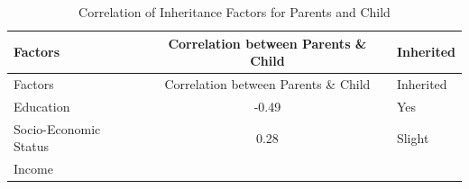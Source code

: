 \documentclass[12pt,twoside]{reedthesis}
\theoremstyle{definition}
\theoremstyle{definition}
\theoremstyle{remark}
\begin{document}
  \begin{longtable}[]{@{}lcl@{}}
  \caption{\label{tab:inher} Correlation of Inheritance Factors for Parents
  and Child}\tabularnewline
  \toprule
  \begin{minipage}[b]{0.29\columnwidth}\raggedright\strut
  Factors\strut
  \end{minipage} & \begin{minipage}[b]{0.47\columnwidth}\centering\strut
  Correlation between Parents \& Child\strut
  \end{minipage} & \begin{minipage}[b]{0.16\columnwidth}\raggedright\strut
  Inherited\strut
  \end{minipage}\tabularnewline
  \midrule
  \endfirsthead
  \toprule
  \begin{minipage}[b]{0.29\columnwidth}\raggedright\strut
  Factors\strut
  \end{minipage} & \begin{minipage}[b]{0.47\columnwidth}\centering\strut
  Correlation between Parents \& Child\strut
  \end{minipage} & \begin{minipage}[b]{0.16\columnwidth}\raggedright\strut
  Inherited\strut
  \end{minipage}\tabularnewline
  \midrule
  \endhead
  \begin{minipage}[t]{0.29\columnwidth}\raggedright\strut
  Education\strut
  \end{minipage} & \begin{minipage}[t]{0.47\columnwidth}\centering\strut
  -0.49\strut
  \end{minipage} & \begin{minipage}[t]{0.16\columnwidth}\raggedright\strut
  Yes\strut
  \end{minipage}\tabularnewline
  \begin{minipage}[t]{0.29\columnwidth}\raggedright\strut
  Socio-Economic Status\strut
  \end{minipage} & \begin{minipage}[t]{0.47\columnwidth}\centering\strut
  0.28\strut
  \end{minipage} & \begin{minipage}[t]{0.16\columnwidth}\raggedright\strut
  Slight\strut
  \end{minipage}\tabularnewline
  \begin{minipage}[t]{0.29\columnwidth}\raggedright\strut
  Income\strut
  \end{minipage} & \begin{minipage}[t]{0.47\columnwidth}\centering\strut

\end{minipage}
\end{longtable}
\end{document}
